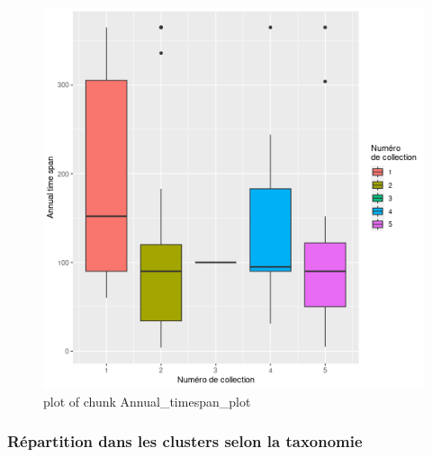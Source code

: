 \begin{figure}
\centering
\includegraphics{./img/85d1f067903ecf46ea5379990605207eea6dfa23.png}
\caption{plot of chunk Annual\_timespan\_plot}
\end{figure}

\hypertarget{ruxe9partition-dans-les-clusters-selon-la-taxonomie}{%
\subsubsection{Répartition dans les clusters selon la
taxonomie}\label{ruxe9partition-dans-les-clusters-selon-la-taxonomie}}

